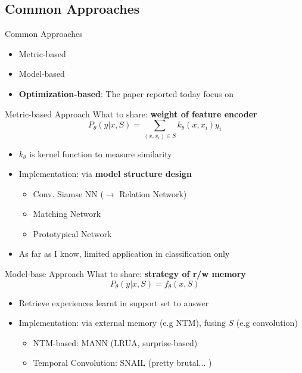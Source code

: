 \documentclass{beamer}
\begin{document}
\subsection{Common Approaches}
\begin{frame}{Common Approaches}
  \begin{itemize}
    \item Metric-based
    \item Model-based
    \item \textbf{Optimization-based}: The paper reported today focus on
  \end{itemize}
\end{frame}

\begin{frame}{Metric-based Approach}
  What to share: \textbf{weight of feature encoder}
  \[ P_\theta (y|x,S) = \sum_{(x,x_i) \in S} k_\theta (x,x_i) y_i \]
  \begin{itemize}
    \item $k_\theta$ is kernel function to measure similarity
    \item Implementation: via \textbf{model structure design}
      \begin{itemize}
        \item Conv. Siamse NN ($\rightarrow$ Relation Network)
        \item Matching Network
        \item Prototypical Network
      \end{itemize}
    \item As far as I know, limited application in classification only
  \end{itemize}
\end{frame}

\begin{frame}{Model-base Approach}
  What to share: \textbf{strategy of r/w memory}
  \[ P_\theta(y|x,S) = f_\theta(x,S) \]
  \begin{itemize}
    \item Retrieve experiences learnt in support set to answer
    \item Implementation: via external memory (e.g NTM), fusing $S$ (e.g convolution)
    \begin{itemize}
      \item NTM-based: MANN (LRUA, surprise-based)
      \item Temporal Convolution: SNAIL (pretty brutal... )
    \end{itemize}
  \end{itemize}
\end{frame}
\end{document}

